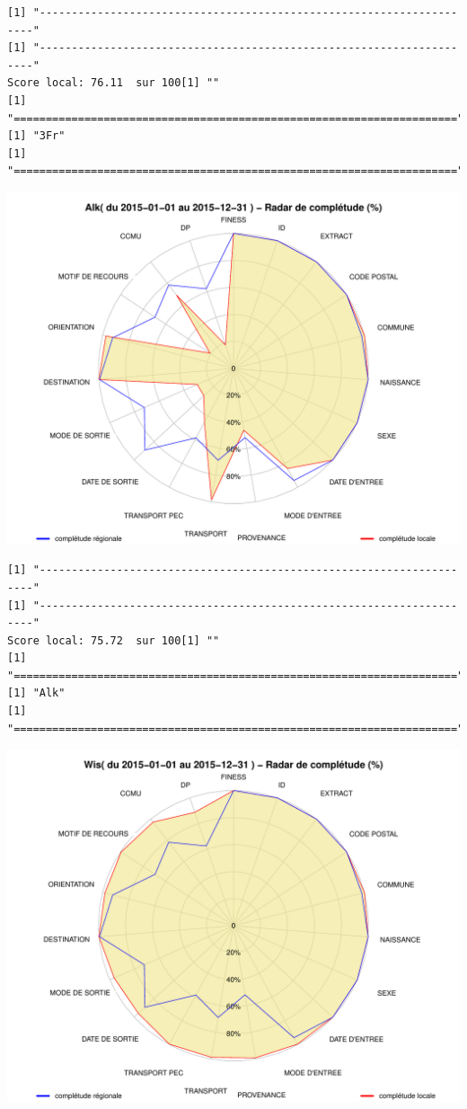 \documentclass[]{article}
\begin{document}
\begin{verbatim}
[1] "---------------------------------------------------------------------"
[1] "---------------------------------------------------------------------"
Score local: 76.11  sur 100[1] ""
[1] "====================================================================="
[1] "3Fr"
[1] "====================================================================="
\end{verbatim}

\includegraphics{completude_files/figure-latex/finess-8.pdf}

\begin{verbatim}
[1] "---------------------------------------------------------------------"
[1] "---------------------------------------------------------------------"
Score local: 75.72  sur 100[1] ""
[1] "====================================================================="
[1] "Alk"
[1] "====================================================================="
\end{verbatim}

\includegraphics{completude_files/figure-latex/finess-9.pdf}
\end{document}
